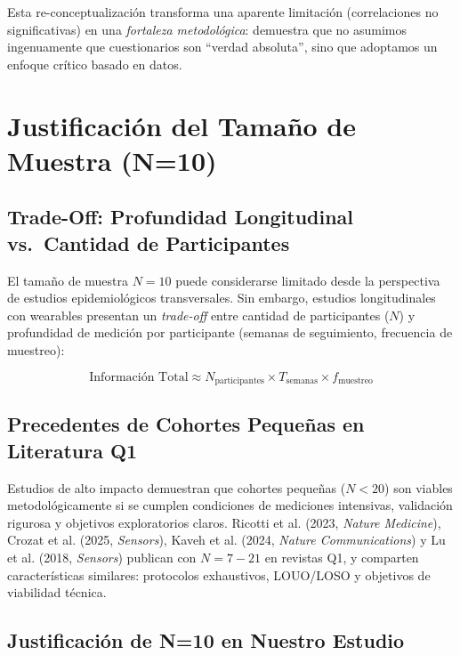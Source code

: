 Esta re-conceptualización transforma una aparente limitación (correlaciones no significativas) en una \textit{fortaleza metodológica}: demuestra que no asumimos ingenuamente que cuestionarios son ``verdad absoluta'', sino que adoptamos un enfoque crítico basado en datos.

\section{Justificación del Tamaño de Muestra (N=10)}
\label{sec:justificacion_n10}

\subsection{Trade-Off: Profundidad Longitudinal vs.\ Cantidad de Participantes}
\label{subsec:tradeoff_longitudinal}

El tamaño de muestra $N=10$ puede considerarse limitado desde la perspectiva de estudios epidemiológicos transversales. Sin embargo, estudios longitudinales con wearables presentan un \textit{trade-off} entre cantidad de participantes ($N$) y profundidad de medición por participante (semanas de seguimiento, frecuencia de muestreo):

\begin{equation}
\text{Información Total} \approx N_{\text{participantes}} \times T_{\text{semanas}} \times f_{\text{muestreo}}
\end{equation}

\subsection{Precedentes de Cohortes Pequeñas en Literatura Q1}
\label{subsec:precedentes_cohortes_pequenas}

Estudios de alto impacto demuestran que cohortes pequeñas ($N < 20$) son viables metodológicamente si se cumplen condiciones de mediciones intensivas, validación rigurosa y objetivos exploratorios claros. Ricotti et al. (2023, \textit{Nature Medicine}), Crozat et al. (2025, \textit{Sensors}), Kaveh et al. (2024, \textit{Nature Communications}) y Lu et al. (2018, \textit{Sensors}) publican con $N=7-21$ en revistas Q1, y comparten características similares: protocolos exhaustivos, LOUO/LOSO y objetivos de viabilidad técnica.

\subsection{Justificación de N=10 en Nuestro Estudio}
\label{subsec:justificacion_n10_estudio}

